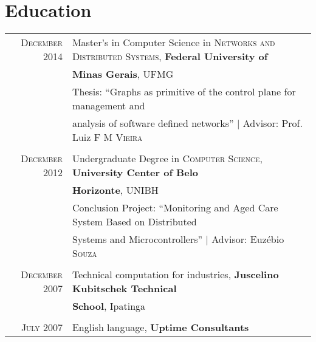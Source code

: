 \documentclass[a4paper,10pt]{article} %
\begin{document}

\section{Education}

\begin{tabular}{rl}
\textsc{December} 2014 & Master's in Computer Science in
\textsc{Networks and Distributed Systems},  \textbf{Federal University of}
\\ & \textbf{Minas Gerais}, UFMG \\
& Thesis: ``Graphs as primitive of the control plane for management and
\\ & analysis of software defined networks''
| \small Advisor: Prof. Luiz \textsc{F M Vieira} \\
&\\


\textsc{December} 2012& Undergraduate Degree in
\textsc{}\textsc{Computer Science},
\normalsize\textbf{ University Center of Belo}
\\ & \textbf{Horizonte}, UNIBH \\
& Conclusion Project: ``Monitoring and Aged Care System Based on
Distributed
\\ & Systems and Microcontrollers''
| \small Advisor: Euzébio \textsc{Souza} \\
&\\


\textsc{December} 2007 &Technical computation for industries,
\textbf{Juscelino Kubitschek Technical}
\\ & \textbf{School}, Ipatinga \\
&\\


\textsc{July} 2007 & English language, \textbf{Uptime Consultants}
\end{tabular}
\end{document}
